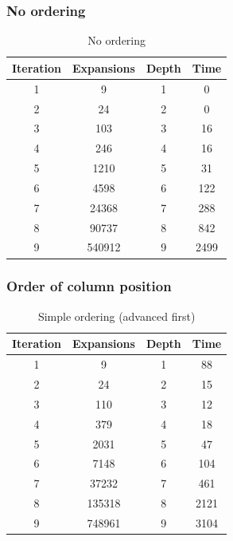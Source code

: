 \documentclass[11pt,a4paper,notitlepage]{article}
\begin{document}
\subsubsection{No ordering}
\begin{table}[H]
	\begin{center}
		\begin{tabular}{c|c|c|c}
			Iteration & Expansions & Depth & Time \\
			\hline
			1 & 9 & 1 & 0 \\
			2 & 24 & 2 & 0 \\
			3 & 103 & 3 & 16 \\
			4 & 246 & 4 & 16 \\
			5 & 1210 & 5 & 31 \\
			6 & 4598 & 6 & 122 \\
			7 & 24368 & 7 & 288 \\
			8 & 90737 & 8 & 842 \\
			9 & 540912 & 9 & 2499 \\
		\end{tabular}
	\end{center}
	\caption{No ordering}
	\label{table:noOrd}
\end{table}
\subsubsection{Order of column position}
\begin{table}[H]
	\begin{center}
		\begin{tabular}{c|c|c|c}
			Iteration & Expansions & Depth & Time \\
			\hline
			1 & 9 & 1 & 88 \\
			2 & 24 & 2 & 15 \\
			3 & 110 & 3 & 12 \\
			4 & 379 & 4 & 18 \\
			5 & 2031 & 5 & 47 \\
			6 & 7148 & 6 & 104 \\
			7 & 37232 & 7 & 461 \\
			8 & 135318 & 8 & 2121 \\
			9 & 748961 & 9 & 3104 \\
		\end{tabular}
	\end{center}
	\caption{Simple ordering (advanced first)}
	\label{table:pqAdv}
\end{table}
\end{document}
